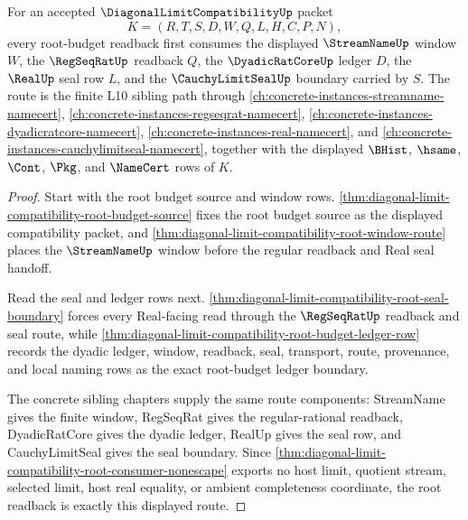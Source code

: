 \begin{theorem}
\label{thm:diagonal-limit-compatibility-root-readback-exactness}
For an accepted $\DiagonalLimitCompatibilityUp$ packet
$$
K=(R,T,S,D,W,Q,L,H,C,P,N),
$$
every root-budget readback first consumes the displayed $\StreamNameUp$ window $W$, the $\RegSeqRatUp$ readback $Q$, the $\DyadicRatCoreUp$ ledger $D$, the $\RealUp$ seal row $L$, and the $\CauchyLimitSealUp$ boundary carried by $S$. The route is the finite L10 sibling path through \autoref{ch:concrete-instances-streamname-namecert}, \autoref{ch:concrete-instances-regseqrat-namecert}, \autoref{ch:concrete-instances-dyadicratcore-namecert}, \autoref{ch:concrete-instances-real-namecert}, and \autoref{ch:concrete-instances-cauchylimitseal-namecert}, together with the displayed $\BHist$, $\hsame$, $\Cont$, $\Pkg$, and $\NameCert$ rows of $K$.
\end{theorem}
\begin{proof}
Start with the root budget source and window rows. \autoref{thm:diagonal-limit-compatibility-root-budget-source} fixes the root budget source as the displayed compatibility packet, and \autoref{thm:diagonal-limit-compatibility-root-window-route} places the $\StreamNameUp$ window before the regular readback and Real seal handoff.

Read the seal and ledger rows next. \autoref{thm:diagonal-limit-compatibility-root-seal-boundary} forces every Real-facing read through the $\RegSeqRatUp$ readback and seal route, while \autoref{thm:diagonal-limit-compatibility-root-budget-ledger-row} records the dyadic ledger, window, readback, seal, transport, route, provenance, and local naming rows as the exact root-budget ledger boundary.

The concrete sibling chapters supply the same route components: StreamName gives the finite window, RegSeqRat gives the regular-rational readback, DyadicRatCore gives the dyadic ledger, RealUp gives the seal row, and CauchyLimitSeal gives the seal boundary. Since \autoref{thm:diagonal-limit-compatibility-root-consumer-nonescape} exports no host limit, quotient stream, selected limit, host real equality, or ambient completeness coordinate, the root readback is exactly this displayed route.
\end{proof}

